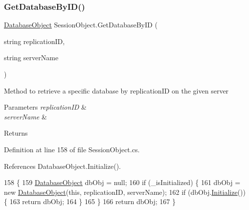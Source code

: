 \subsubsection{\texorpdfstring{Get\+Database\+By\+I\+D()}{GetDatabaseByID()}}
{\footnotesize\ttfamily \mbox{\hyperlink{class_database_object}{Database\+Object}} Session\+Object.\+Get\+Database\+By\+ID (\begin{DoxyParamCaption}\item[{string}]{replication\+ID,  }\item[{string}]{server\+Name }\end{DoxyParamCaption})}



Method to retrieve a specific database by replication\+ID on the given server 


\begin{DoxyParams}{Parameters}
{\em replication\+ID} & \\
\hline
{\em server\+Name} & \\
\hline
\end{DoxyParams}
\begin{DoxyReturn}{Returns}

\end{DoxyReturn}


Definition at line 158 of file Session\+Object.\+cs.



References Database\+Object.\+Initialize().


\begin{DoxyCode}
158                                                                                    \{
159         \mbox{\hyperlink{class_database_object}{DatabaseObject}} dbObj = null;
160         \textcolor{keywordflow}{if} (\_isInitialized) \{
161             dbObj = \textcolor{keyword}{new} \mbox{\hyperlink{class_database_object}{DatabaseObject}}(\textcolor{keyword}{this}, replicationID, serverName);
162             \textcolor{keywordflow}{if} (dbObj.\mbox{\hyperlink{class_database_object_a7de43a21bd287deec537cffec343f41d}{Initialize}}()) \{
163                 \textcolor{keywordflow}{return} dbObj;
164             \}
165         \}
166         \textcolor{keywordflow}{return} dbObj;
167     \}
\end{DoxyCode}
\mbox{\label{class_session_object_af3b9c9d56d98c848061952ed935f815b}} 
